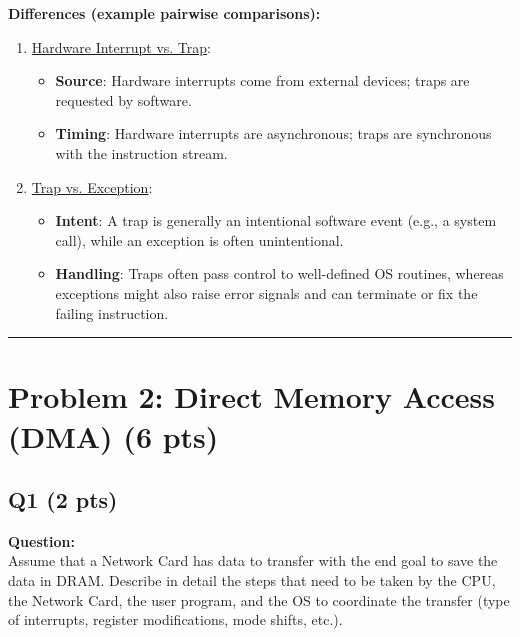 \documentclass[12pt]{article}
\begin{document}
	\textbf{Differences (example pairwise comparisons):}
	\begin{enumerate}
		\item \underline{Hardware Interrupt vs. Trap}:
		\begin{itemize}
			\item \textbf{Source}: Hardware interrupts come from external devices; traps are requested by software.
			\item \textbf{Timing}: Hardware interrupts are asynchronous; traps are synchronous with the instruction stream.
		\end{itemize}
		\item \underline{Trap vs. Exception}:
		\begin{itemize}
			\item \textbf{Intent}: A trap is generally an intentional software event (e.g., a system call), while an exception is often unintentional.
			\item \textbf{Handling}: Traps often pass control to well-defined OS routines, whereas exceptions might also raise error signals and can terminate or fix the failing instruction.
		\end{itemize}
	\end{enumerate}
	
	\hrule
	\vspace{0.5cm}
	
	\section{Problem 2: Direct Memory Access (DMA) (6 pts)}
	\subsection*{Q1 (2 pts)}
	\textbf{Question:} \\
	Assume that a Network Card has data to transfer with the end goal to save the data in DRAM. Describe in detail the steps that need to be taken by the CPU, the Network Card, the user program, and the OS to coordinate the transfer (type of interrupts, register modifications, mode shifts, etc.).
	
\end{document}
